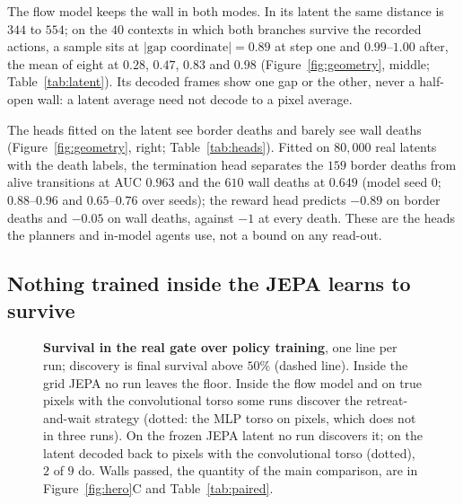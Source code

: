 The flow model keeps the wall in both modes. In its latent the same distance is $344$ to $554$; on
the $40$ contexts in which both branches survive the recorded actions, a sample sits at
$\lvert\text{gap coordinate}\rvert = 0.89$ at step one and $0.99$--$1.00$ after, the mean of eight at
$0.28$, $0.47$, $0.83$ and $0.98$ (Figure~\ref{fig:geometry}, middle; Table~\ref{tab:latent}). Its decoded frames show one gap or the other, never a half-open wall: a latent average need not decode to a pixel average.

The heads fitted on the latent see border deaths and barely see wall deaths
(Figure~\ref{fig:geometry}, right; Table~\ref{tab:heads}). Fitted on $80{,}000$ real latents with the
death labels, the termination head separates the $159$ border deaths from alive transitions at AUC
$0.963$ and the $610$ wall deaths at $0.649$ (model seed $0$; $0.88$--$0.96$ and $0.65$--$0.76$ over
seeds); the reward head predicts $-0.89$ on border deaths and $-0.05$ on wall deaths, against $-1$ at every death. These are the heads the planners and in-model agents use, not a bound on any read-out.

\subsection{Nothing trained inside the JEPA learns to survive}
\label{sec:results-ppo}

\begin{table}[t]
\centering
\caption{\textbf{Gate controllers, graded in the real environment.} Walls per episode and survival to the cap, mean $\pm$ s.d.\ over runs; ``discovered'' counts runs with final survival above $50\%$. Simulator search uses the true reward, no terminal value; real-gate PPO uses $1.5$M steps.}
\label{tab:paired}
\end{table}

\begin{figure}[t]
\centering
{}
\caption{\textbf{Survival in the real gate over policy training}, one line per run; discovery is final survival above $50\%$ (dashed line). Inside the grid JEPA no run leaves the floor. Inside the flow model and on true pixels with the convolutional torso some runs discover the retreat-and-wait strategy (dotted: the MLP torso on pixels, which does not in three runs). On the frozen JEPA latent no run discovers it; on the latent decoded back to pixels with the convolutional torso (dotted), $2$ of $9$ do. Walls passed, the quantity of the main comparison, are in Figure~\ref{fig:hero}C and Table~\ref{tab:paired}.}
\label{fig:discovery}
\end{figure}

